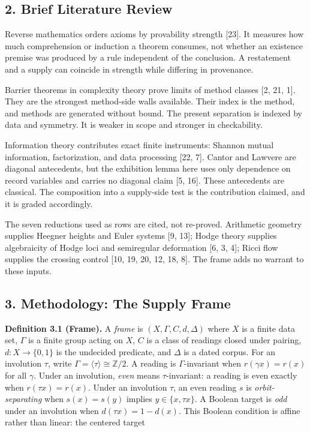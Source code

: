 \documentclass[10pt,twocolumn]{article}
\begin{document}
\subsection{2. Brief Literature Review}\label{brief-literature-review}

Reverse mathematics orders axioms by provability strength {[}23{]}. It
measures how much comprehension or induction a theorem consumes, not
whether an existence premise was produced by a rule independent of the
conclusion. A restatement and a supply can coincide in strength while
differing in provenance.

Barrier theorems in complexity theory prove limits of method classes
{[}2, 21, 1{]}. They are the strongest method-side walls available.
Their index is the method, and methods are generated without bound. The
present separation is indexed by data and symmetry. It is weaker in
scope and stronger in checkability.

Information theory contributes exact finite instruments: Shannon mutual
information, factorization, and data processing {[}22, 7{]}. Cantor and
Lawvere are diagonal antecedents, but the exhibition lemma here uses
only dependence on record variables and carries no diagonal claim {[}5,
16{]}. These antecedents are classical. The composition into a
supply-side test is the contribution claimed, and it is graded
accordingly.

The seven reductions used as rows are cited, not re-proved. Arithmetic
geometry supplies Heegner heights and Euler systems {[}9, 13{]}; Hodge
theory supplies algebraicity of Hodge loci and semiregular deformation
{[}6, 3, 4{]}; Ricci flow supplies the crossing control {[}10, 19, 20,
12, 18, 8{]}. The frame adds no warrant to these inputs.

\subsection{3. Methodology: The Supply
Frame}\label{methodology-the-supply-frame}

\textbf{Definition 3.1 (Frame).} A \emph{frame} is
\((X, \Gamma, C, d, \Delta)\) where \(X\) is a finite data set,
\(\Gamma\) is a finite group acting on \(X\), \(C\) is a class of
readings closed under pairing, \(d : X \to \{0, 1\}\) is the undecided
predicate, and \(\Delta\) is a dated corpus. For an involution \(\tau\),
write \(\Gamma = \langle \tau \rangle \cong \mathbb{Z}/2\). A reading is
\(\Gamma\)-invariant when \(r(\gamma x) = r(x)\) for all \(\gamma\).
Under an involution, \emph{even} means \(\tau\)-invariant: a reading is
even exactly when \(r(\tau x) = r(x)\). Under an involution \(\tau\), an
even reading \(s\) is \emph{orbit-separating} when \(s(x) = s(y)\)
implies \(y \in \{x, \tau x\}\). A Boolean target is \emph{odd} under an
involution when \(d(\tau x) = 1 - d(x)\). This Boolean condition is
affine rather than linear: the centered target
\end{document}
